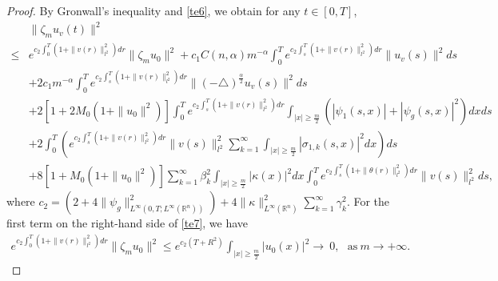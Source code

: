 \documentclass[11pt]{article}
\numberwithin{equation}{section}
\theoremstyle{plain}
\def\geq{\geqslant}
\def\leq{\leqslant}
\begin{document}
\begin{proof}
 By Gronwall's inequality and \eqref{te6}, we obtain for any $t \in [0, T]$,
\begin{align} \label{te7}
      & \| \zeta_m u_v(t) \|^2 \nonumber \\
 \leq & e^{ c_2 \int_0^T \left( 1 + \| v(r) \|_{l^2}^2 \right) dr }
        \| \zeta_m u_0 \|^2
        + c_1 C(n,\alpha) m^{-\alpha} \int_0^T e^{ c_2 \int_s^T \left( 1 + \| v(r) \|_{l^2}^2 \right) dr } \| u_v(s) \|^2 ds
          \nonumber \\
      & + 2 c_1 m^{-\alpha} \int_0^T e^{ c_2 \int_s^T \left( 1 + \| v(r) \|_{l^2}^2 \right) dr } \| (-\triangle)^{\frac{\alpha}{2}} u_v(s) \|^2 ds
            \nonumber \\
      & + 2 \left[ 1 + 2M_0( 1 + \| u_0 \|^2) \right]
               \int_0^T e^{ c_2 \int_s^T \left( 1 + \| v(r) \|_{l^2}^2 \right) dr }
                       \int_{|x| \geq \frac{m}{2}}
                                \left( |\psi_1(s,x)| + |\psi_g(s,x)|^2 \right)
                       dx
             ds
          \nonumber \\
      & + 2 \int_0^T
      \left (
       e^{ c_2
         \int_s^T \left( 1 + \| v(r) \|_{l^2}^2 \right) dr }
                     \| v(s) \|_{l^2}^2
                       \sum_{k=1}^{\infty}
                         \int_{|x| \geq \frac{m}{2}} |\sigma_{1,k} (s,x)|^2 dx
           \right )  ds
           \nonumber \\
      & + 8 \left[ 1 + M_0(1 + \|u_0\|^2) \right]
          \sum_{k=1}^{\infty} \beta_k^2
             \int_{|x| \geq \frac{m}{2}} |\kappa(x)|^2 dx
                   \int_0^T e^{ c_2 \int_s^T \left( 1 + \| \theta(r) \|_{l^2}^2 \right) dr }
                            \| v(s) \|_{l^2}^2
                   ds,
\end{align}
 where
      $ c_2 = \left( 2 + 4 \|\psi_g\|_{L^\infty(0,T; L^\infty(\mathbb{R}^n) ) }^2
              \right)
              + 4 \| \kappa \|_{L^\infty(\mathbb{R}^n)}^2
                       \sum_{k=1}^{\infty} \gamma_k^2.
      $
For the first term on the right-hand side of \eqref{te7},
 we have
\begin{align} \label{te8}
      e^{ c_2 \int_0^T \left( 1 + \| v(r) \|_{l^2}^2 \right) dr }
      \| \zeta_m u_0 \|^2
 \leq e^{ c_2 (T + R^2)}
        \int_{|x| \geq \frac{m}{2}} | u_0(x) |^2
  \rightarrow  \ 0, \ \ \   \text{as} \ m \to +\infty.
 \end{align}


\end{proof}
\end{document}
